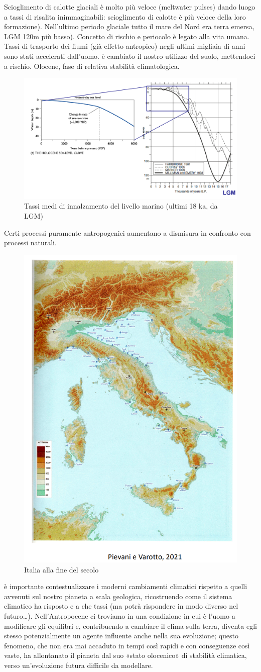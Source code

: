 Scioglimento di calotte glaciali è molto più veloce (meltwater pulses) dando luogo a tassi di risalita inimmaginabili: scioglimento di calotte è più veloce della loro formazione). Nell'ultimo periodo glaciale tutto il mare del Nord era terra emersa, LGM 120m più basso). 
Concetto di rischio e periocolo è legato alla vita umana. Tassi di trasporto dei fiumi (già effetto antropico) negli ultimi migliaia di anni sono stati accelerati dall'uomo. è cambiato il nostro utilizzo del suolo, mettendoci a rischio. 
Olocene, fase di relativa stabilità climatologica. 
\begin{figure}[htpb]
    \centering
    \includegraphics[width=0.5\linewidth]{uploads/innalzamento livelli del mare.png}
    \caption{Tassi medi di innalzamento del livello marino (ultimi 18 ka, da LGM)}
\end{figure}
Certi processi puramente antropogenici aumentano a dismisura in confronto con processi naturali.
\begin{figure}[htpb]
    \centering
    \includegraphics[width=0.5\linewidth]{uploads/italy.png}
    \caption{Italia alla fine del secolo}
\end{figure}
è importante contestualizzare i moderni
cambiamenti climatici rispetto a quelli avvenuti
sul nostro pianeta a scala geologica,
ricostruendo come il sistema climatico ha
risposto e a che tassi (ma potrà rispondere in
modo diverso nel futuro…). Nell’Antropocene ci troviamo in una condizione in cui è l’uomo a modificare
gli equilibri e, contribuendo a cambiare il clima sulla terra, diventa egli stesso
potenzialmente un agente influente anche nella sua evoluzione; questo fenomeno, che non era mai accaduto in tempi così rapidi e con
conseguenze così vaste, ha allontanato il pianeta dal suo «stato olocenico»
di stabilità climatica, verso un’evoluzione futura difficile da modellare.
